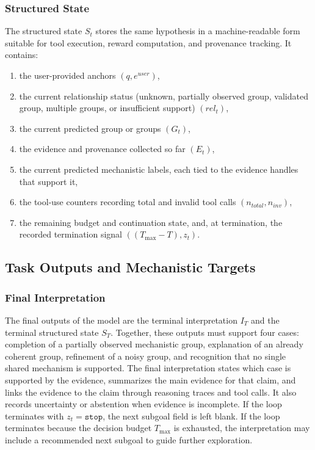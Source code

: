 \documentclass[thesis,letterpaper,12pt]{utthesis}
\begin{document}
\subsubsection{Structured State}\label{sec:structured_state}
The structured state $S_t$ stores the same hypothesis in a machine-readable form suitable for tool execution, reward computation, and provenance tracking. It contains:
\begin{enumerate}
    \item the user-provided anchors $(q, e^{user})$,
    \item the current relationship status (unknown, partially observed group, validated group, multiple groups, or insufficient support) $(rel_t)$,
    \item the current predicted group or groups $(G_t)$,
    \item the evidence and provenance collected so far $(E_t)$,
    \item the current predicted mechanistic labels, each tied to the evidence handles that support it,
    \item the tool-use counters recording total and invalid tool calls $(n_{total}, n_{inv})$,
    \item the remaining budget and continuation state, and, at termination, the recorded termination signal $((T_{\max} - T), z_t)$.
\end{enumerate}

\subsection{Task Outputs and Mechanistic Targets}\label{sec:task}

\subsubsection{Final Interpretation}
The final outputs of the model are the terminal interpretation $I_T$ and the terminal structured state $S_T$. Together, these outputs must support four cases: completion of a partially observed mechanistic group, explanation of an already coherent group, refinement of a noisy group, and recognition that no single shared mechanism is supported. The final interpretation states which case is supported by the evidence, summarizes the main evidence for that claim, and links the evidence to the claim through reasoning traces and tool calls. It also records uncertainty or abstention when evidence is incomplete. If the loop terminates with $z_t = \texttt{stop}$, the next subgoal field is left blank. If the loop terminates because the decision budget $T_{\max}$ is exhausted, the interpretation may include a recommended next subgoal to guide further exploration.
\end{document}
